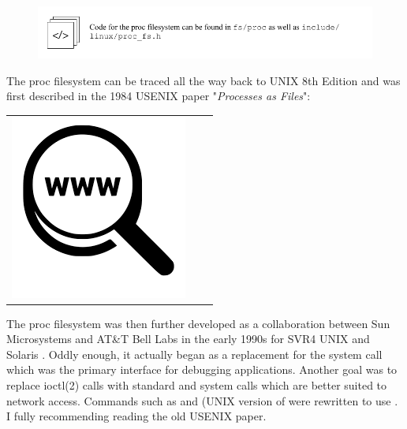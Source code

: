 \begin{figure}[h]
	\includegraphics[scale=0.95]{src-xref/procfs.pdf}
\end{figure}

The proc filesystem can be traced all the way back to UNIX 8th Edition and was first described in the 1984 USENIX paper "\textit{Processes as Files}":

\begin{table}[h]
\begin{tabular}{lcl}
\parbox[r]{0.5in}{ \includegraphics[scale=0.15]{figures/url.png}} & \parbox[l]{0.1in}{} & \parbox[l]{3in}{}
\end{tabular}
\end{table}

The proc filesystem was then further developed as a collaboration between Sun Microsystems and AT\&T Bell Labs in the early 1990s for SVR4 UNIX and Solaris . Oddly enough, it actually began as a replacement for the  system call which was the primary interface for debugging applications. Another goal was to replace ioctl(2) calls with standard  and  system calls which are better suited to network access. Commands such as  and  (UNIX version of  were rewritten to use . I fully recommending reading the old USENIX paper.

